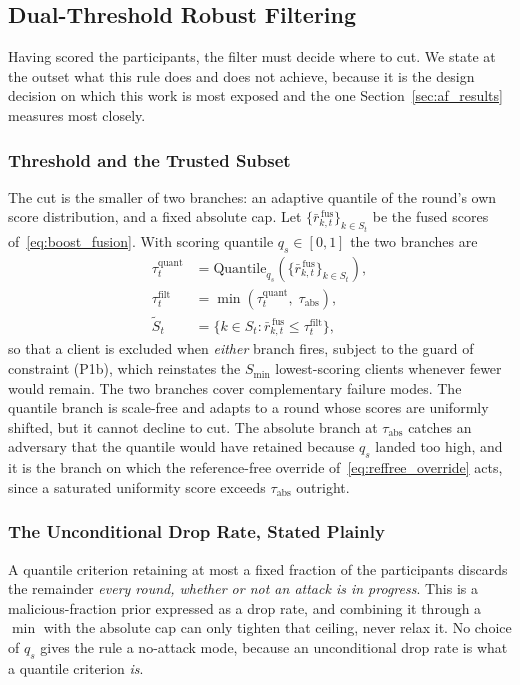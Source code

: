 \documentclass[journal]{IEEEtran}
\begin{document}
\subsection{Dual-Threshold Robust Filtering}
\label{sec:dual_threshold}

Having scored the participants, the filter must decide where to cut. We state at the outset what this rule does and does not achieve, because it is the design decision on which this work is most exposed and the one Section~\ref{sec:af_results} measures most closely.

\subsubsection{Threshold and the Trusted Subset}
The cut is the smaller of two branches: an adaptive quantile of the round's own score distribution, and a fixed absolute cap. Let $\{\bar r^{\,\mathrm{fus}}_{k,t}\}_{k \in S_t}$ be the fused scores of~\eqref{eq:boost_fusion}. With scoring quantile $q_s \in [0,1]$ the two branches are
\begin{align}
\tau_t^{\mathrm{quant}} &= \mathrm{Quantile}_{q_s}\!\left( \bigl\{ \bar r^{\,\mathrm{fus}}_{k,t} \bigr\}_{k \in S_t} \right), \label{eq:quant_threshold}\\
\tau_t^{\mathrm{filt}} &= \min\!\left( \tau_t^{\mathrm{quant}},\; \tau_{\mathrm{abs}} \right), \label{eq:dual_thresh}\\
\widetilde{S}_t &= \bigl\{ k \in S_t : \bar r^{\,\mathrm{fus}}_{k,t} \le \tau_t^{\mathrm{filt}} \bigr\}, \label{eq:filtered_set}
\end{align}
so that a client is excluded when \emph{either} branch fires, subject to the guard of constraint (P1b), which reinstates the $S_{\min}$ lowest-scoring clients whenever fewer would remain. The two branches cover complementary failure modes. The quantile branch is scale-free and adapts to a round whose scores are uniformly shifted, but it cannot decline to cut. The absolute branch at $\tau_{\mathrm{abs}}$ catches an adversary that the quantile would have retained because $q_s$ landed too high, and it is the branch on which the reference-free override of~\eqref{eq:reffree_override} acts, since a saturated uniformity score exceeds $\tau_{\mathrm{abs}}$ outright.

\subsubsection{The Unconditional Drop Rate, Stated Plainly}
\label{sec:drop_floor}
A quantile criterion retaining at most a fixed fraction of the participants discards the remainder \emph{every round, whether or not an attack is in progress}. This is a malicious-fraction prior expressed as a drop rate, and combining it through a $\min$ with the absolute cap can only tighten that ceiling, never relax it. No choice of $q_s$ gives the rule a no-attack mode, because an unconditional drop rate is what a quantile criterion \emph{is}.
\end{document}
